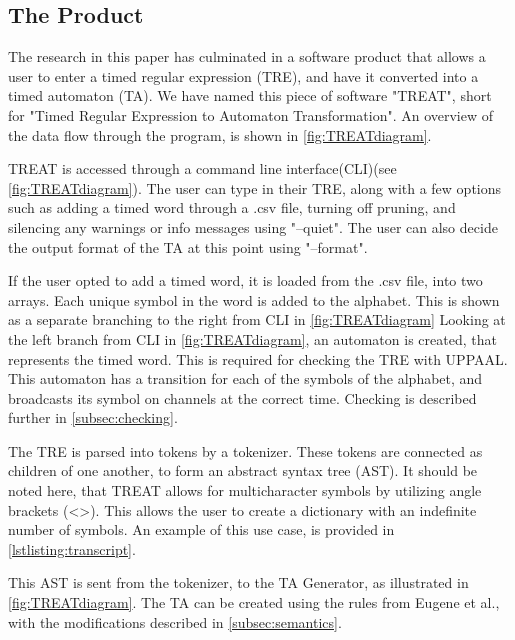 \subsection{The Product}\label{subsec:theProduct}
The research in this paper has culminated in a software product that allows a user to enter a timed regular expression (TRE), and have it converted into a timed automaton (TA).
We have named this piece of software "TREAT", short for "Timed Regular Expression to Automaton Transformation".
An overview of the data flow through the program, is shown in \cref{fig:TREATdiagram}.



TREAT is accessed through a command line interface(CLI)(see \cref*{fig:TREATdiagram}). The user can type in their TRE, along with a few options such as adding a timed word through a .csv file, turning off pruning, and silencing any warnings or info messages using "--quiet".
The user can also decide the output format of the TA at this point using "--format".

If the user opted to add a timed word, it is loaded from the .csv file, into two arrays. Each unique symbol in the word is added to the alphabet. This is shown as a separate branching to the right from CLI in \cref*{fig:TREATdiagram}
Looking at the left branch from CLI in \cref*{fig:TREATdiagram}, an automaton is created, that represents the timed word. This is required for checking the TRE with UPPAAL. This automaton has a transition for each of the symbols of the alphabet, and broadcasts its symbol on channels at the correct time. Checking is described further in \cref{subsec:checking}.

The TRE is parsed into tokens by a tokenizer. These tokens are connected as children of one another, to form an abstract syntax tree (AST). 
It should be noted here, that TREAT allows for multicharacter symbols by utilizing angle brackets (<>). This allows the user to create a dictionary with an indefinite number of symbols. An example of this use case, is provided in \cref{lstlisting:transcript}.

This AST is sent from the tokenizer, to the TA Generator, as illustrated in \cref*{fig:TREATdiagram}. The TA can be created using the rules from Eugene et al., with the modifications described in \cref{subsec:semantics}.

